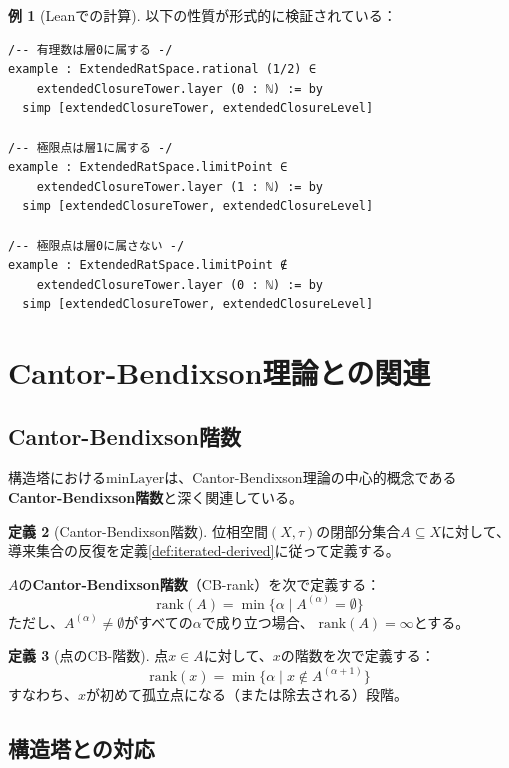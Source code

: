 \documentclass[a4paper,12pt]{ltjsarticle}
\theoremstyle{definition}
\newtheorem{definition}{定義}[section]
\newtheorem{example}[definition]{例}
\begin{document}
\begin{example}[Leanでの計算]
以下の性質が形式的に検証されている：

\begin{lstlisting}[language=Lean]
/-- 有理数は層0に属する -/
example : ExtendedRatSpace.rational (1/2) ∈
    extendedClosureTower.layer (0 : ℕ) := by
  simp [extendedClosureTower, extendedClosureLevel]

/-- 極限点は層1に属する -/
example : ExtendedRatSpace.limitPoint ∈
    extendedClosureTower.layer (1 : ℕ) := by
  simp [extendedClosureTower, extendedClosureLevel]

/-- 極限点は層0に属さない -/
example : ExtendedRatSpace.limitPoint ∉
    extendedClosureTower.layer (0 : ℕ) := by
  simp [extendedClosureTower, extendedClosureLevel]
\end{lstlisting}
\end{example}

\section{Cantor-Bendixson理論との関連}

\subsection{Cantor-Bendixson階数}

構造塔における$\mathrm{minLayer}$は、Cantor-Bendixson理論の中心的概念である
\textbf{Cantor-Bendixson階数}と深く関連している。

\begin{definition}[Cantor-Bendixson階数]
位相空間$(X, \tau)$の閉部分集合$A \subseteq X$に対して、
導来集合の反復を定義\ref{def:iterated-derived}に従って定義する。

$A$の\textbf{Cantor-Bendixson階数}（CB-rank）を次で定義する：
\[
\mathrm{rank}(A) = \min\{\alpha \mid A^{(\alpha)} = \emptyset\}
\]
ただし、$A^{(\alpha)} \neq \emptyset$がすべての$\alpha$で成り立つ場合、
$\mathrm{rank}(A) = \infty$とする。
\end{definition}

\begin{definition}[点のCB-階数]
点$x \in A$に対して、$x$の階数を次で定義する：
\[
\mathrm{rank}(x) = \min\{\alpha \mid x \notin A^{(\alpha+1)}\}
\]
すなわち、$x$が初めて孤立点になる（または除去される）段階。
\end{definition}

\subsection{構造塔との対応}
\end{document}
